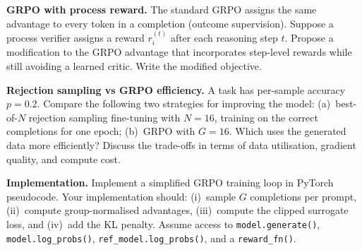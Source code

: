 \begin{exercise}
\label{ex:grpo-8}
\textbf{GRPO with process reward.}  The standard GRPO assigns the same advantage to every token in a completion (outcome supervision).  Suppose a process verifier assigns a reward $r_i^{(t)}$ after each reasoning step $t$.  Propose a modification to the GRPO advantage that incorporates step-level rewards while still avoiding a learned critic.  Write the modified objective.
\end{exercise}

\begin{exercise}
\label{ex:grpo-9}
\textbf{Rejection sampling vs GRPO efficiency.}  A task has per-sample accuracy $p = 0.2$.  Compare the following two strategies for improving the model: (a)~best-of-$N$ rejection sampling fine-tuning with $N = 16$, training on the correct completions for one epoch; (b)~GRPO with $G = 16$.  Which uses the generated data more efficiently?  Discuss the trade-offs in terms of data utilisation, gradient quality, and compute cost.
\end{exercise}

\begin{exercise}
\label{ex:grpo-10}
\textbf{Implementation.}  Implement a simplified GRPO training loop in PyTorch pseudocode.  Your implementation should: (i)~sample $G$ completions per prompt, (ii)~compute group-normalised advantages, (iii)~compute the clipped surrogate loss, and (iv)~add the KL penalty.  Assume access to \texttt{model.generate()}, \texttt{model.log\_probs()}, \texttt{ref\_model.log\_probs()}, and a \texttt{reward\_fn()}.
\end{exercise}

